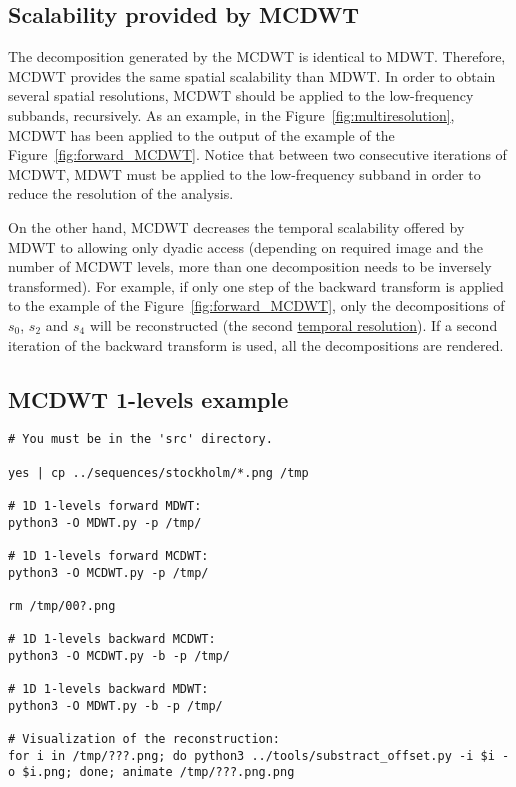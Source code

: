 \subsection{Scalability provided by MCDWT}
The decomposition generated by the MCDWT is identical to
MDWT. Therefore, MCDWT provides the same spatial scalability than
MDWT. In order to obtain several spatial resolutions, MCDWT should be
applied to the low-frequency subbands, recursively. As an example, in
the Figure~\ref{fig:multiresolution}, MCDWT has been applied to the
output of the example of the Figure~\ref{fig:forward_MCDWT}. Notice
that between two consecutive iterations of MCDWT, MDWT must be applied
to the low-frequency subband in order to reduce the resolution of the
analysis.

On the other hand, MCDWT decreases the temporal scalability offered by
MDWT to allowing only dyadic access (depending on required image and
the number of MCDWT levels, more than one decomposition needs to be
inversely transformed). For example, if only one step of the backward
transform is applied to the example of the
Figure~\ref{fig:forward_MCDWT}, only the decompositions of $s_0$,
$s_2$ and $s_4$ will be reconstructed (the second
\href{https://en.wikipedia.org/wiki/Temporal_resolution}{temporal
  resolution}). If a second iteration of the backward transform is
used, all the decompositions are rendered.

\subsection{MCDWT 1-levels example}
\begin{verbatim}
# You must be in the 'src' directory.

yes | cp ../sequences/stockholm/*.png /tmp

# 1D 1-levels forward MDWT:
python3 -O MDWT.py -p /tmp/

# 1D 1-levels forward MCDWT:
python3 -O MCDWT.py -p /tmp/

rm /tmp/00?.png

# 1D 1-levels backward MCDWT:
python3 -O MCDWT.py -b -p /tmp/

# 1D 1-levels backward MDWT:
python3 -O MDWT.py -b -p /tmp/

# Visualization of the reconstruction:
for i in /tmp/???.png; do python3 ../tools/substract_offset.py -i $i -o $i.png; done; animate /tmp/???.png.png
\end{verbatim}

